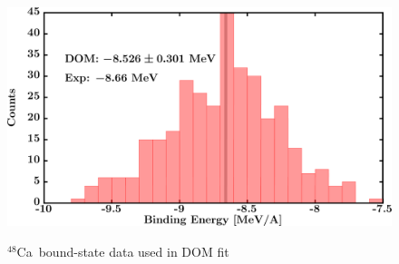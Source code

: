 \documentclass[twocolumn,secnumarabic,amssymb, nobibnotes, aps, prl,
superscriptaddress, nobalancelastpage]{revtex4}
\newcommand{\caEight}{\ensuremath{^{48}}C\lowercase{a}}
\begin{document}
\begin{figure}[!htb]
\begin{minipage}{0.4\linewidth}
        \label{DOM_ca48_RMSRadius}
    \end{minipage}
    \begin{minipage}{0.4\linewidth}
        \centering
        \includegraphics[width=\linewidth]{figures/ca48_BE.png}
        \label{DOM_ca48_BE}
    \end{minipage}
    \caption{\caEight\ bound-state data used in DOM fit}
    \label{DOM_ca48_structural}
\end{figure}
\end{document}
